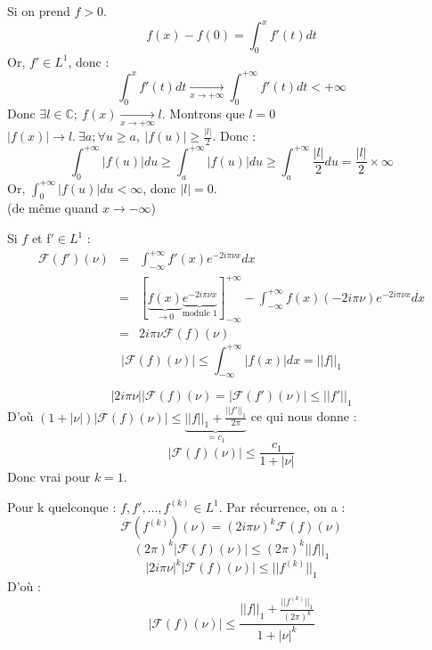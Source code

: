 \documentclass{article}
\begin{document}
\begin{dem}
Si on prend $f>0$. \[f(x)-f(0) = \int_0^x f'(t) dt\]
Or, $f'\in L^1$, donc :\[\int_0^x f'(t)dt \xrightarrow[x\to +\infty]{} \int_0^{+\infty} f'(t)dt <+\infty\]
Donc $\exists l\in \mathbb{C};\ f(x) \xrightarrow[x\to+\infty]{} l$. Montrons que $l=0$
$|f(x)|\to l.\ \exists a; \forall u\geq a,\ |f(u)| \geq \frac{|l|}{2}$. Donc :
\[\int_0^{+\infty} |f(u)| du \geq \int_a^{+\infty} |f(u)|du \geq  \int_a^{+\infty} \frac{|l|}{2} du = \frac{|l|}{2} \times \infty\]
Or, $\int_0^{+\infty} |f(u)| du < \infty$, donc $|l|=0$. \\
(de même quand $x\to -\infty$)
\end{dem}

\begin{dem}[de la propriété 1]
Si $f$ et f$'\in L^1$ :
\begin{eqnarray*}
\mathcal{F}(f')(\nu)&=& \int_{-\infty}^{+\infty} f'(x) e^{-2i\pi \nu x} dx \\
	&=& \left[\underbrace{f(x)}_{\to 0}\underbrace{e^{-2i\pi\nu x}}_{\text{module 1}} \right]_{-\infty}^{+\infty} - \int_{-\infty}^{+\infty} f(x)(-2i\pi\nu)e^{-2i\pi\nu x}dx\\
	&=& 2i\pi\nu \mathcal{F}(f)(\nu)
\end{eqnarray*}
\[|\mathcal{F}(f)(\nu)|\leq \int_{-\infty}^{+\infty} |f(x)| dx = ||f||_1\]

\[|2i\pi\nu||\mathcal{F}(f)(\nu)=|\mathcal{F}(f')(\nu)|\leq ||f'||_1\]
D'où $(1+|\nu|)|\mathcal{F}(f)(\nu)|\leq \underbrace{||f||_1 + \frac{||f'||_1}{2\pi}}_{=c_1}$ ce qui nous donne : 
\[|\mathcal{F}(f)(\nu)|\leq \frac{c_1}{1+|\nu|}\]
Donc vrai pour $k=1$.

Pour k quelconque : $f,f',...,f^{(k)} \in L^1$. Par récurrence, on a :
\[\mathcal{F}(f^{(k)})(\nu)=(2i\pi\nu)^k\mathcal{F}(f)(\nu)\]
\[(2\pi)^k|\mathcal{F}(f)(\nu)|\leq (2\pi)^k ||f||_1\]
\[|2i\pi\nu|^k|\mathcal{F}(f)(\nu)|\leq||f^{(k)}||_1\]
D'où :
\[|\mathcal{F}(f)(\nu)|\leq \frac{||f||_1+\frac{||f^{(k)}||_1}{(2\pi)^k}}{1+|\nu|^k}\]
\end{dem}

\bigskip
{}
\end{document}
